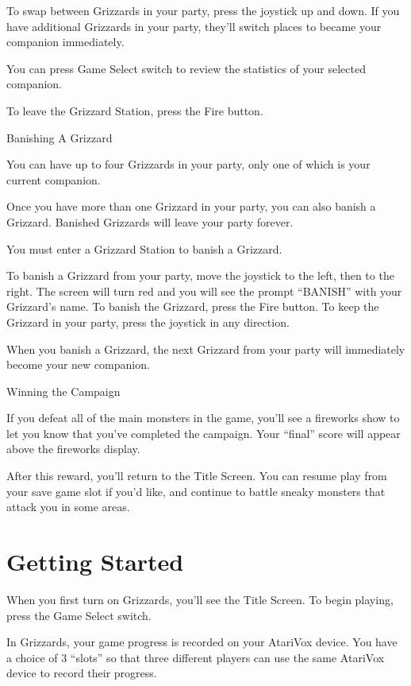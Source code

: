 \documentclass[10pt,twoside,openright]{memoir}
\begin{document}
To swap between Grizzards in your party, press the joystick up and down. If
you have additional Grizzards in your party, they'll switch places to became
your companion immediately.

You can press Game Select switch to review the statistics of
your selected companion.

To leave the Grizzard Station, press the Fire button.



Banishing A Grizzard

You can have up to four Grizzards in your party, only one of which is your
current companion.

Once you have more than one Grizzard in your party, you can also banish a
Grizzard.  Banished Grizzards will leave your party forever.  

You must enter a Grizzard Station to banish a Grizzard.

To banish a
Grizzard from your party, move the joystick to the left, then to the right. 
The screen will turn red and you will see the prompt ``BANISH'' with your
Grizzard's name. To banish the Grizzard, press the Fire button. To keep the
Grizzard in your party, press the joystick in any direction.

When you banish a Grizzard, the next Grizzard from your party will
immediately become your new companion.



Winning the Campaign

If you defeat all of the main monsters in the game, you'll see a fireworks
show to let you know that you've completed the campaign. Your ``final''
score will appear above the fireworks display.

After this reward, you'll return to the Title Screen. You can resume play
from your save game slot if you'd like, and continue to battle sneaky
monsters that attack you in some areas.



\chapter{Getting Started}\label{Getting Started}

When you first turn on Grizzards, you'll see the Title
Screen. To begin playing, press the Game Select switch.

In  Grizzards,  your game  progress is  recorded on  your
AtariVox  device. You  have  a choice  of 3  ``slots''  so that  three
different players  can use  the same AtariVox  device to  record their
progress.
\end{document}
